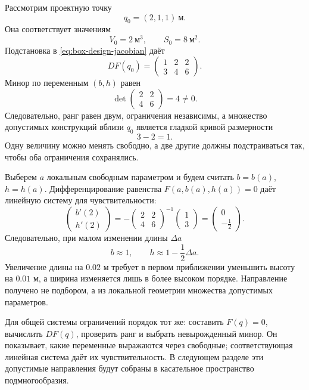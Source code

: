 Рассмотрим проектную точку
\[
q_0=(2,1,1)\ \text{м}.
\]
Она соответствует значениям
\[
V_0=2\ \text{м}^3,
\qquad
S_0=8\ \text{м}^2.
\]
Подстановка в \eqref{eq:box-design-jacobian} даёт
\[
DF(q_0)
=
\begin{pmatrix}
1&2&2\\
3&4&6
\end{pmatrix}.
\]
Минор по переменным \((b,h)\) равен
\begin{equation}
\label{eq:box-design-regular-minor}
\det
\begin{pmatrix}
2&2\\
4&6
\end{pmatrix}
=4\neq0.
\end{equation}
Следовательно, ранг равен двум, ограничения независимы, а множество допустимых конструкций вблизи \(q_0\) является гладкой кривой размерности
\[
3-2=1.
\]
Одну величину можно менять свободно, а две другие должны подстраиваться так, чтобы оба ограничения сохранялись.

Выберем \(a\) локальным свободным параметром и будем считать \(b=b(a)\), \(h=h(a)\). Дифференцирование равенства \(F(a,b(a),h(a))=0\) даёт линейную систему для чувствительности:
\begin{equation}
\label{eq:box-design-local-sensitivity}
\begin{pmatrix}
b'(2)\\h'(2)
\end{pmatrix}
=-
\begin{pmatrix}
2&2\\4&6
\end{pmatrix}^{-1}
\begin{pmatrix}
1\\3
\end{pmatrix}
=
\begin{pmatrix}
0\\-\tfrac12
\end{pmatrix}.
\end{equation}
Следовательно, при малом изменении длины \(\Delta a\)
\[
b\approx1,
\qquad
h\approx1-\frac12\Delta a.
\]
Увеличение длины на \(0.02\) м требует в первом приближении уменьшить высоту на \(0.01\) м, а ширина изменяется лишь в более высоком порядке. Направление получено не подбором, а из локальной геометрии множества допустимых параметров.

Для общей системы ограничений порядок тот же: составить \(F(q)=0\), вычислить \(DF(q)\), проверить ранг и выбрать невырожденный минор. Он показывает, какие переменные выражаются через свободные; соответствующая линейная система даёт их чувствительность. В следующем разделе эти допустимые направления будут собраны в касательное пространство подмногообразия.

